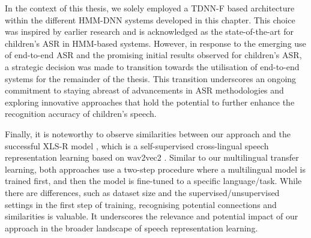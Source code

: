 In the context of this thesis, we solely employed a \ac{TDNN-F} based architecture within the different \ac{HMM-DNN} systems developed in this chapter. This choice was inspired by earlier research \cite{tdnnf-children} and is acknowledged as the state-of-the-art for children's \ac{ASR} in \ac{HMM}-based systems. However, in response to the emerging use of end-to-end \ac{ASR} and the promising initial results observed for children's \ac{ASR}, a strategic decision was made to transition towards the utilisation of end-to-end systems for the remainder of the thesis. This transition underscores an ongoing commitment to staying abreast of advancements in \ac{ASR} methodologies and exploring innovative approaches that hold the potential to further enhance the recognition accuracy of children's speech.

Finally, it is noteworthy to observe similarities between our approach and the successful XLS-R model \cite{babu2021xlsr}, which is a self-supervised cross-lingual speech representation learning based on wav2vec2 \cite{baevski2020wav2vec}. Similar to our multilingual transfer learning, both approaches use a two-step procedure where a multilingual model is trained first, and then the model is fine-tuned to a specific language/task. While there are differences, such as dataset size and the supervised/unsupervised settings in the first step of training, recognising potential connections and similarities is valuable. It underscores the relevance and potential impact of our approach in the broader landscape of speech representation learning.
